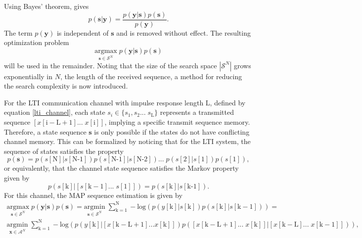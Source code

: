 Using Bayes' theorem, gives
\begin{equation*}
p(\mathbf{s}|\mathbf{y}) = 
\frac
{p(\mathbf{y}|\mathbf{s})p(\mathbf{s})}
{p(\mathbf{y})}.
\end{equation*} 
The term $p(\mathbf{y})$ is independent of $\mathbf{s}$ and is removed without effect. The resulting optimization problem
\begin{equation}\label{opt_problem}
\underset{\mathbf{s}\in\mathcal{S}^N}{\text{argmax}}\; p(\mathbf{y}|\mathbf{s})p(\mathbf{s})
\end{equation}
will be used in the remainder.
Noting that the size of the search space $|\mathcal{S}^N|$ grows exponentially in $N$, the length of the received sequence, a method for reducing the search complexity is now introduced. 
\par
For the LTI communication channel with impulse response length L, defined by equation \eqref{lti_channel}, each state $s_i \in \{s_1, s_2... \; s_{\text{L}}\}$ represents a transmitted sequence $[x[\mathrm{i-L+1}]...\;x[\mathrm{i}]]$, implying a specific transmit sequence memory. Therefore, a state sequence $\mathbf{s}$ is only possible if the states do not have conflicting channel memory. This can be formalized by noticing that for the LTI system, the sequence of states satisfies the property  
\begin{equation*}
p(\mathbf{s}) = p(s[\text{N}]|s[\text{N-1}]) p(s[\text{N-1}]|s[\text{N-2}])... \;p(s[\text{2}]|s[\text{1}])p(s[\text{1}]),
\end{equation*}
or equivalently, that the channel state sequence satisfies the Markov property given by 
\begin{equation*}
p(s[\text{k}]|\left[s[\mathrm{k-1}]... \;s[\mathrm{1}]\right]) = p(s[\text{k}]|s[\text{k-1}]).
\end{equation*}
For this channel, the MAP sequence estimation is given by
\begin{gather*}
\underset{\mathbf{s}\in\mathcal{S}^N}{\text{argmax}} \; p(\mathbf{y}|\mathbf{s})p(\mathbf{s})=
\underset{\mathbf{s}\in\mathcal{S}^N}{\text{argmin}} \; \sum_{\mathrm{k=1}}^{\mathrm{N}} -\text{log}(p(y[\mathrm{k}]|s[\mathrm{k}]) p(s[\mathrm{k}]|s[\mathrm{k-1}]))=\\
\underset{\mathbf{x}\in\mathcal{A}^N}{\text{argmin}} \; \sum_{\mathrm{k=1}}^{\mathrm{N}} -\text{log}(p(y[\mathrm{k}]|\left[x[\mathrm{k-L+1}]...x[\mathrm{k}]\right]) p(\left[x[\mathrm{k-L+1}]...\;x[\mathrm{k}]\right]|\left[x[\mathrm{k-L}]...\;x[\mathrm{k-1}]\right])),
\end{gather*}

